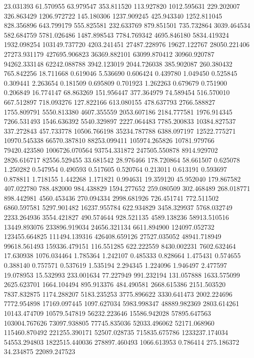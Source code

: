 23.031393
61.570955
63.979547
353.811520
113.927820
1012.595631
229.202007
326.863429
1206.972722
145.180306
1237.909245
425.943340
1252.811045
828.356896
643.799179
555.825581
232.633769
879.851501
735.732864
3039.464534
582.684759
5781.026486
1487.898543
7784.769342
4695.846180
5834.419324
1932.098254
103149.737720
4203.241451
27487.228976
19627.122767
28050.221406
27273.931179
427695.906823
36369.882101
63099.870412
30960.920787
94262.333148
62242.088788
3942.123019
2044.726038
385.902087
260.380432
765.842256
18.711668
0.619046
5.536690
0.606424
0.439780
1.049450
0.525845
0.309441
2.263654
0.181509
0.695809
0.701923
1.262263
0.679679
0.751900
0.206849
16.774147
68.863269
151.956447
377.364979
74.589454
516.570010
667.512897
718.093276
127.822166
613.080155
478.637793
2766.588827
1755.809791
5550.813380
4607.355559
2053.607186
2184.777581
1976.914345
7266.531493
1546.636392
5540.329897
2227.064483
7785.200833
10384.827537
337.272843
457.733778
10506.766198
35234.787788
6388.097197
12522.775271
10970.545338
66570.387810
88253.099411
105974.265826
10781.979766
79420.423580
1006726.070564
93754.331872
247505.550878
8914.929702
2826.616717
82556.529455
33.681542
28.976466
178.720864
58.661507
0.625078
1.250282
0.547954
0.490593
0.517605
0.520764
0.213011
0.613191
0.593697
0.878811
1.718155
1.442268
1.171821
0.994631
19.359120
45.952040
179.867582
407.022780
788.482000
984.438829
1594.277652
259.080509
302.468489
268.018771
898.442981
4560.453436
270.094334
2998.681926
726.451741
772.511502
6860.597581
5297.901482
16237.955784
622.934829
3458.329937
5768.032749
2233.264936
3554.421827
490.574644
928.521135
4589.138236
58913.510516
13449.893076
233896.919034
24656.321134
6611.894900
124097.052732
123455.664825
111494.139316
426408.659126
27527.035052
48941.718949
99618.561493
159336.479151
116.551285
622.222559
8430.002231
7602.632464
17.630938
1076.034464
1.785364
1.242107
0.485333
0.828664
1.475431
0.574655
0.388140
0.757571
0.537619
1.535194
2.294345
1.224096
1.946497
2.477597
19.078953
15.532993
233.001634
77.227949
991.232194
131.057888
1633.575099
2625.623701
1664.104494
895.913376
484.490581
2668.615386
2151.503520
7837.832875
1174.288207
5183.235253
3775.896622
3330.641473
2002.224696
7772.954898
17169.097445
1097.627034
5983.998347
48889.982369
2803.614261
10143.474709
10579.547819
56232.223646
15586.942028
57895.647563
103004.767626
73097.938805
77745.835036
52033.496062
52171.068960
115460.870492
221255.390171
52507.028735
715835.675786
1233237.174034
54553.294803
1822515.440036
278897.460493
1066.613953
0.786414
275.186372
34.234875
22089.247523
